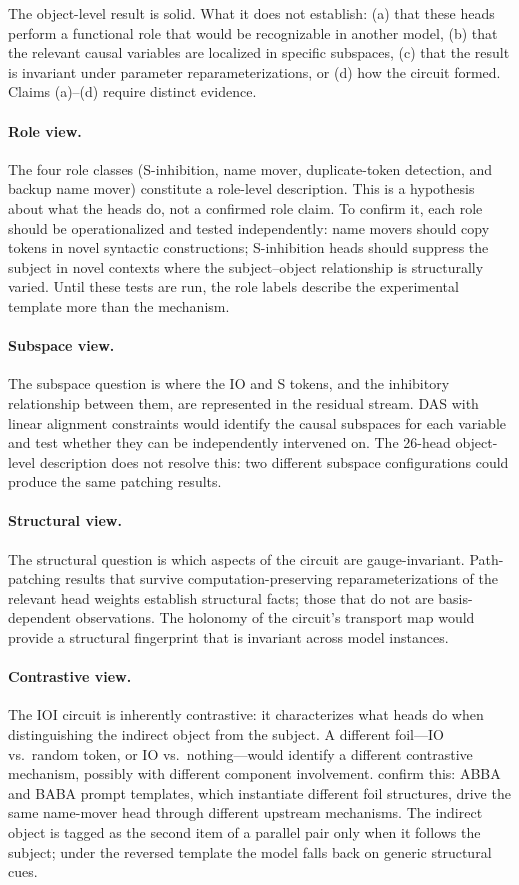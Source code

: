 \documentclass{article}
\begin{document}
The object-level result is solid.  What it does not establish: (a) that
these heads perform a functional role that would be recognizable in
another model, (b) that the relevant causal variables are localized in
specific subspaces, (c) that the result is invariant under parameter
reparameterizations, or (d) how the circuit formed.  Claims (a)--(d)
require distinct evidence.

\paragraph{Role view.}
The four role classes (S-inhibition, name mover, duplicate-token
detection, and backup name mover) constitute a role-level description.
This is a hypothesis about what the heads do, not a confirmed role claim.
To confirm it, each role should be operationalized and tested
independently: name movers should copy tokens in novel syntactic
constructions; S-inhibition heads should suppress the subject in novel
contexts where the subject--object relationship is structurally varied.
Until these tests are run, the role labels describe the experimental
template more than the mechanism.

\paragraph{Subspace view.}
The subspace question is where the IO and S tokens, and the inhibitory
relationship between them, are represented in the residual stream.
DAS with linear alignment constraints would identify the causal
subspaces for each variable and test whether they can be independently
intervened on.  The 26-head object-level description does not resolve
this: two different subspace configurations could produce the same
patching results.

\paragraph{Structural view.}
The structural question is which aspects of the circuit are
gauge-invariant.  Path-patching results that survive
computation-preserving reparameterizations of the relevant head weights
establish structural facts; those that do not are basis-dependent
observations.  The holonomy of the circuit's transport map would provide
a structural fingerprint that is invariant across model instances.

\paragraph{Contrastive view.}
The IOI circuit is inherently contrastive: it characterizes what heads
do when distinguishing the indirect object from the subject.  A
different foil---IO vs.\ random token, or IO vs.\ nothing---would
identify a different contrastive mechanism, possibly with different
component involvement.  \citet{franco2026} confirm this: ABBA and BABA
prompt templates, which instantiate different foil structures, drive the
same name-mover head through different upstream mechanisms.  The
indirect object is tagged as the second item of a parallel pair only
when it follows the subject; under the reversed template the model falls
back on generic structural cues.
\end{document}
